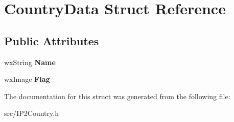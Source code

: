 \section{CountryData Struct Reference}
\label{structCountryData}
\subsection*{Public Attributes}
\begin{DoxyCompactItemize}
\item 
wxString {\bfseries Name}\label{structCountryData_ae6e119be9d91881c6297c28680ff405b}

\item 
wxImage {\bfseries Flag}\label{structCountryData_ad0859b519aba246b320403e0fc063b3a}

\end{DoxyCompactItemize}


The documentation for this struct was generated from the following file:\begin{DoxyCompactItemize}
\item 
src/IP2Country.h\end{DoxyCompactItemize}
